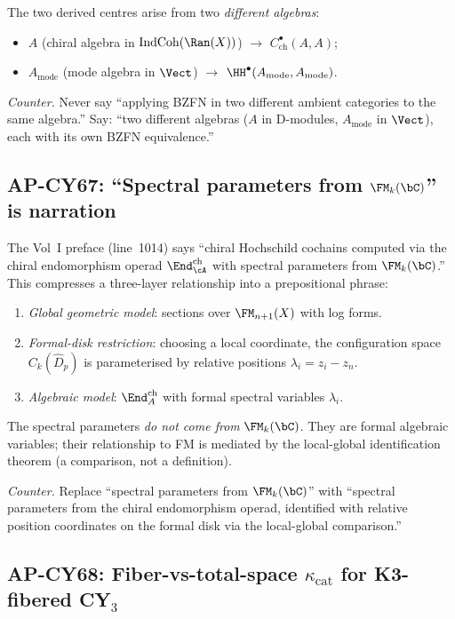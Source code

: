 The two derived centres arise from two \emph{different algebras}:
\begin{itemize}[nosep]
\item $A$ (chiral algebra in $\mathrm{IndCoh}(\Ran(X))$) $\to$
      $C^\bullet_{\mathrm{ch}}(A,A)$;
\item $A_{\mathrm{mode}}$ (mode algebra in $\Vect$) $\to$
      $\HH^\bullet(A_{\mathrm{mode}}, A_{\mathrm{mode}})$.
\end{itemize}

\emph{Counter.}  Never say ``applying BZFN in two different ambient
categories to the same algebra.''  Say: ``two different algebras
($A$ in D-modules, $A_{\mathrm{mode}}$ in $\Vect$), each with its
own BZFN equivalence.''

\subsection{AP-CY67: ``Spectral parameters from $\FM_k(\bC)$'' is narration}

The Vol~I preface (line~1014) says ``chiral Hochschild cochains
computed via the chiral endomorphism operad $\End^{\mathrm{ch}}_\cA$
with spectral parameters from $\FM_k(\bC)$.''  This compresses a
three-layer relationship into a prepositional phrase:
\begin{enumerate}[label=(\roman*),nosep]
\item \emph{Global geometric model}: sections over $\FM_{n+1}(X)$
      with log forms.
\item \emph{Formal-disk restriction}: choosing a local coordinate,
      the configuration space $C_k(\hat{D}_p)$ is parameterised by
      relative positions $\lambda_i = z_i - z_n$.
\item \emph{Algebraic model}: $\End^{\mathrm{ch}}_A$ with formal
      spectral variables $\lambda_i$.
\end{enumerate}
The spectral parameters \emph{do not come from} $\FM_k(\bC)$.
They are formal algebraic variables; their relationship to FM is
mediated by the local-global identification theorem (a comparison,
not a definition).

\emph{Counter.}  Replace ``spectral parameters from $\FM_k(\bC)$''
with ``spectral parameters from the chiral endomorphism operad,
identified with relative position coordinates on the formal disk via
the local-global comparison.''

\subsection{AP-CY68: Fiber-vs-total-space $\kappa_{\mathrm{cat}}$ for
  K3-fibered CY$_3$}

